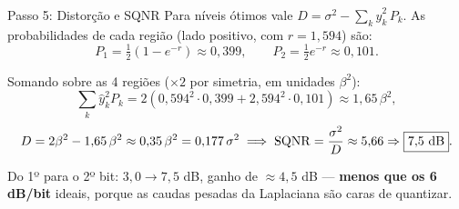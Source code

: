 \begin{frame}{Passo 5: Distorção e SQNR}
  Para níveis ótimos vale $D = \sigma^2 - \sum_k \hat y_k^2\,P_k$. As
  probabilidades de cada região (lado positivo, com $r=1{,}594$) são:
  \[
    P_1 = \tfrac{1}{2}\!\left(1-e^{-r}\right) \approx 0{,}399,
    \qquad
    P_2 = \tfrac{1}{2}e^{-r} \approx 0{,}101.
  \]

  \vspace{0.05cm}
  Somando sobre as 4 regiões ($\times 2$ por simetria, em unidades $\beta^2$):
  \[
    \sum_k \hat y_k^2 P_k = 2\!\left(0{,}594^2\cdot 0{,}399
       + 2{,}594^2\cdot 0{,}101\right) \approx 1{,}65\,\beta^2,
  \]
  \[
    D = 2\beta^2 - 1{,}65\,\beta^2 \approx 0{,}35\,\beta^2 = 0{,}177\,\sigma^2
    \;\Longrightarrow\;
    \SQNR = \frac{\sigma^2}{D} \approx 5{,}66 \Rightarrow \boxed{7{,}5\ \text{dB}}.
  \]

  \begin{block}{}
  \footnotesize Do 1º para o 2º bit: $3{,}0 \to 7{,}5$ dB, ganho de
  $\approx 4{,}5$ dB — \textbf{menos que os 6 dB/bit} ideais, porque as
  caudas pesadas da Laplaciana são caras de quantizar.
  \end{block}
\end{frame}
